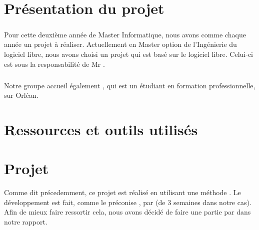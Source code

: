\documentclass[french]{report}
\begin{document}
\chapter{Présentation du projet}
\paragraph{}Pour cette deuxième année de Master Informatique, nous avons comme chaque année un projet à réaliser. Actuellement en Master option de l'Ingénierie du logiciel libre, nous avons choisi un projet qui est basé sur le logiciel libre. Celui-ci est sous la responsabilité de Mr \responsableProjet.
\paragraph{}Notre groupe accueil également \etudiantSL, qui est un étudiant en formation professionnelle, sur Orléan.



\chapter{Ressources et outils utilisés}



\chapter{Projet}
Comme dit précedemment, ce projet est réalisé en utilisant une méthode \agile{}. Le développement est fait, comme le préconise \scrum{}, par \sprint{} (de 3 semaines dans notre cas). Afin de mieux faire ressortir cela, nous avons décidé de faire une partie par \sprint{} dans notre rapport.
\end{document}
